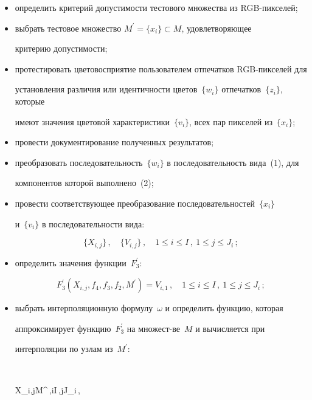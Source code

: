 \begin{itemize}


\item определить критерий допустимости тестового множества из RGB-пикселей;


\item выбрать тестовое множество $M^\prime =\{x_i\}\subset M$, удовлетворяющее


критерию допустимости;


\item протестировать цветовосприятие пользователем отпечатков RGB-пикселей для


установления различия или идентичности цветов~$\{w_i\}$ отпечатков~$\{z_i\}$, которые


имеют значения цветовой характеристики~$\{v_i\}$, всех пар пикселей из~$\{x_i\}$;


\item провести документирование полученных результатов;


\item преобразовать последовательность~$\{w_i\}$ в последовательность вида~(1), для


компонентов которой выполнено~(2);


\item провести соответствующее преобразование последовательностей~$\{x_i\}$


и~$\{v_i\}$ в последовательности вида:


$$


\{X_{i,j}\}\,,\quad \{V_{i,j}\}\,,\quad 1\leq i\leq I\,,\  1\leq j\leq J_i\,;


$$


\item определить значения функции~$F^\prime_3$:


$$


F^\prime_3(X_{i,j},f_4,f_3,f_2, M^\prime )=V_{i,1}\,,\quad 1\leq i\leq I\,,\ 1\leq j\leq J_i\,;


$$


\item выбрать интерполяционную формулу~$\omega$ и определить функцию, которая


аппроксимирует функцию~$F^\prime_3$ на множест-\linebreak ве~$M$ и вычисляется при


интерполяции  по узлам из~$M^\prime$:


$$


X_{i,j}\in M^\prime\,,\leq i\leq I\,,\leq j\leq J_i\,,



\end{itemize}
